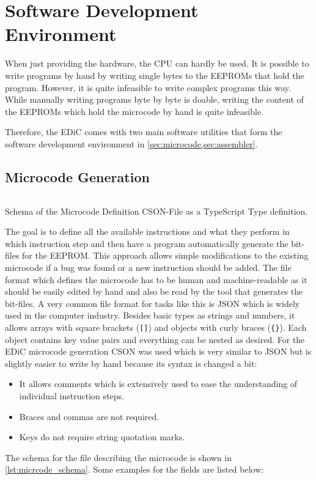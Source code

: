 \chapter{Software Development Environment}\label{cha:software}
When just providing the hardware, the \gls{CPU} can hardly be used.
It is possible to write programs by hand by writing single bytes to the \glspl{EEPROM} that hold the program.
However, it is quite infeasible to write complex programs this way.
While manually writing programs byte by byte is doable, writing the content of the \glspl{EEPROM} which hold the microcode by hand is quite infeasible.

Therefore, the \gls{EDiC} comes with two main software utilities that form the software development environment in \cref{sec:microcode,sec:assembler}.

\section{Microcode Generation}\label{sec:microcode}
\begin{listing}[t]
  \inputminted[linenos,
    breaklines,
    frame=leftline,
    xleftmargin=20pt,
  ]{TypeScript}{src/microcode.ts}
  \caption{Schema of the Microcode Definition CSON-File \cite{CSON} as a TypeScript \cite{TS} Type definition.}
  \label{lst:micrcode_schema}
\end{listing}
The goal is to define all the available instructions and what they perform in which instruction step and then have a program automatically generate the bit-files for the \gls{EEPROM}.
This approach allows simple modifications to the existing microcode if a bug was found or a new instruction should be added.
The file format which defines the microcode has to be human and machine-readable as it should be easily edited by hand and also be read by the tool that generates the bit-files.
A very common file format for tasks like this is \gls{JSON} \cite{JSON} which is widely used in the computer industry.
Besides basic types as strings and numbers, it allows arrays with square brackets (\texttt{[]}) and objects with curly braces (\texttt{\{\}}).
Each object contains key value pairs and everything can be nested as desired.
For the \gls{EDiC} microcode generation \gls{CSON} was used which is very similar to \gls{JSON} but is slightly easier to write by hand because its syntax is changed a bit:
\begin{itemize}
  \item It allows comments which is extensively used to ease the understanding of individual instruction steps.
  \item Braces and commas are not required.
  \item Keys do not require string quotation marks.
\end{itemize}
The schema for the file describing the microcode is shown in \cref{lst:micrcode_schema}.
Some examples for the fields are listed below:
